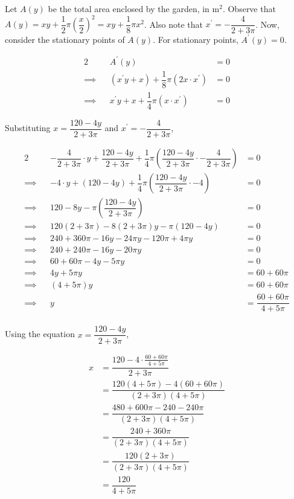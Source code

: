 \documentclass{echw}
\begin{document}
        Let $A(y)$ be the total area enclosed by the garden, in m$^2$. Observe that $A(y) = xy + \dfrac12 \pi \left(\dfrac{x}2\right)^2 = xy + \dfrac18 \pi x^2$. Also note that $x^\prime = -\dfrac4{2 + 3\pi}$. Now, consider the stationary points of $A(y)$. For stationary points, $A^\prime(y) = 0$.

        \begin{alignat*}{2}
            &&A^\prime(y) &= 0\\
            \implies&&\left(x^\prime y + x\right) + \dfrac18 \pi (2x \cdot x^\prime) &= 0\\
            \implies&&x^\prime y + x + \dfrac14 \pi (x \cdot x^\prime) &= 0
        \end{alignat*}

        Substituting $x = \dfrac{120-4y}{2+3\pi}$ and $x^\prime = -\dfrac4{2 + 3\pi}$,

        \begin{alignat*}{2}
            &&-\dfrac4{2 + 3\pi} \cdot y + \dfrac{120-4y}{2+3\pi} + \dfrac14 \pi \left(\dfrac{120-4y}{2+3\pi} \cdot -\dfrac4{2 + 3\pi}\right) &= 0\\
            \implies&&-4 \cdot y + (120-4y) + \dfrac14 \pi \left(\dfrac{120-4y}{2+3\pi} \cdot -4\right) &= 0\\
            \implies&&120 - 8y - \pi \left(\dfrac{120-4y}{2+3\pi}\right) &= 0\\
            \implies&&120(2+3\pi) - 8(2+3\pi)y - \pi(120-4y) &= 0\\
            \implies&&240 + 360\pi - 16y - 24\pi y - 120\pi + 4\pi y &= 0\\
            \implies&&240 + 240\pi - 16y - 20\pi y &= 0\\
            \implies&&60 + 60\pi - 4y - 5\pi y &= 0\\
            \implies&& 4y + 5\pi y &= 60 + 60\pi\\
            \implies&& (4 + 5\pi)y &= 60 + 60\pi\\
            \implies&& y &= \dfrac{60 + 60\pi}{4 + 5\pi}\\
        \end{alignat*}

        Using the equation $x = \dfrac{120-4y}{2 + 3\pi}$, 

        \begin{align*}
            x &= \dfrac{120-4\cdot\tfrac{60 + 60\pi}{4 + 5\pi}}{2 + 3\pi}\\
            &= \dfrac{120(4+5\pi) - 4(60 + 60\pi)}{(2+3\pi)(4+5\pi)}\\
            &= \dfrac{480 + 600\pi - 240 -240\pi}{(2+3\pi)(4+5\pi)}\\
            &= \dfrac{240 + 360\pi}{(2+3\pi)(4+5\pi)}\\
            &= \dfrac{120 (2 + 3\pi)}{(2+3\pi)(4+5\pi)}\\
            &= \dfrac{120}{4+5\pi}
        \end{align*}
\end{document}
